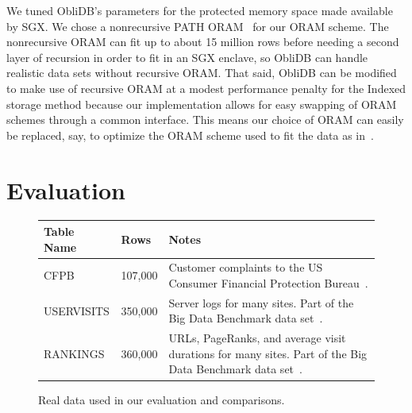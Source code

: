 \documentclass[letterpaper,twocolumn,10pt]{article}
\def\name/{ObliDB}
\begin{document}
We tuned ObliDB's parameters for the protected memory space made available by SGX. We chose a nonrecursive PATH ORAM~\cite{SDS+13} for our ORAM scheme. The nonrecursive ORAM can fit up to about 15 million rows before needing a second layer of recursion in order to fit in an SGX enclave, so \name/ can handle realistic data sets without recursive ORAM. That said, \name/ can be modified to make use of recursive ORAM at a modest performance penalty for the Indexed storage method because our implementation allows for easy swapping of ORAM schemes through a common interface. This means our choice of ORAM can easily be replaced, say, to optimize the ORAM scheme used to fit the data as in~\cite{ZWR+16}.

\section{Evaluation}\label{eval}
\begin{figure}
\small
\centering
\begin{tabular}{llp{3.5cm}}
\textbf{Table Name} & \textbf{Rows} & \textbf{Notes} \\\hline\rule{0pt}{2ex}
CFPB & 107,000 & Customer complaints to the US Consumer Financial Protection Bureau~\cite{CFPB}.\\
USERVISITS & 350,000 & Server logs for many sites. Part of the Big Data Benchmark data set~\cite{BDB}.\\
RANKINGS & 360,000 & URLs, PageRanks, and average visit durations for many sites. Part of the Big Data Benchmark data set~\cite{BDB}.\\
\end{tabular}
\caption{\small Real data used in our evaluation and comparisons.}
\label{tabletable}
\end{figure}
\end{document}

